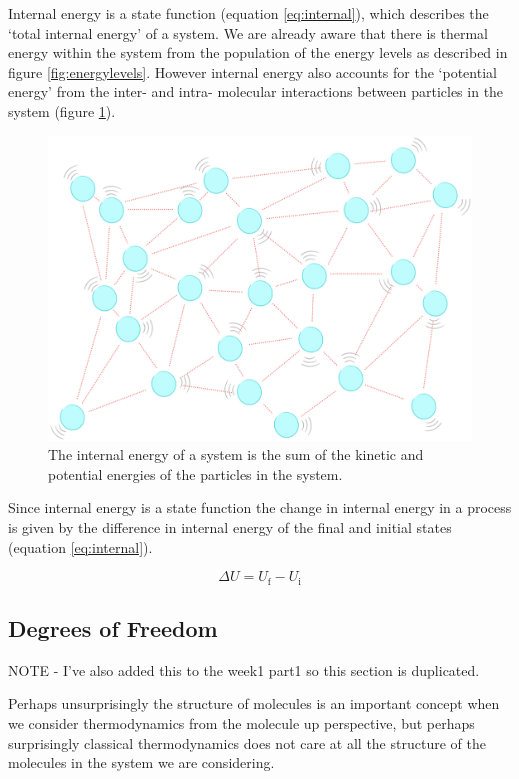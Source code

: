 \documentclass[
]{book}
\begin{document}
Internal energy is a state function (equation \eqref{eq:internal}), which describes the `total internal energy' of a system. We are already aware that there is thermal energy within the system from the population of the energy levels as described in figure \ref{fig:energylevels}. However internal energy also accounts for the `potential energy' from the inter- and intra- molecular interactions between particles in the system (figure \ref{fig:internalenergy}).

\begin{figure}

{\centering \includegraphics[width=0.8\linewidth]{images/internalenergy} 

}

\caption{The internal energy of a system is the sum of the kinetic and potential energies of the particles in the system.}\label{fig:internalenergy}
\end{figure}

Since internal energy is a state function the change in internal energy in a process is given by the difference in internal energy of the final and initial states (equation \eqref{eq:internal}).

\begin{equation}
\Delta U = U_\textrm{f} - U_\textrm{i}
\label{eq:internal}
\end{equation}

\hypertarget{degrees-of-freedom}{%
\subsection{Degrees of Freedom}\label{degrees-of-freedom}}

NOTE - I've also added this to the week1 part1 so this section is duplicated.

Perhaps unsurprisingly the structure of molecules is an important concept when we consider thermodynamics from the molecule up perspective, but perhaps surprisingly classical thermodynamics does not care at all the structure of the molecules in the system we are considering.
\end{document}
